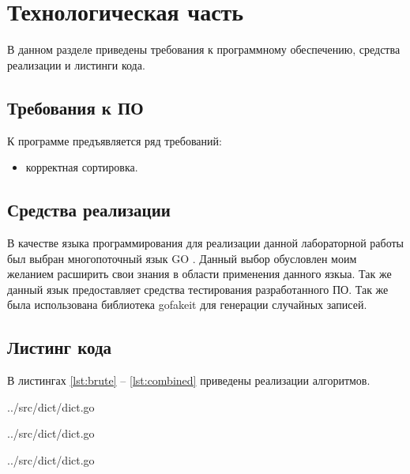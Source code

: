 \chapter{Технологическая часть}

В данном разделе приведены требования к программному обеспечению, средства реализации и листинги кода.

\section{Требования к ПО}

К программе предъявляется ряд требований:
\begin{itemize}
	\item корректная сортировка.
\end{itemize}

\section{Средства реализации}

В качестве языка программирования для реализации данной лабораторной работы был выбран многопоточный язык GO \cite{golang}. Данный выбор обусловлен моим желанием расширить свои знания в области применения данного язкыа. Так же данный язык предоставляет средства тестирования разработанного ПО. Так же была использована библиотека {\ttfamily gofakeit} \cite{faker} для генерации случайных записей.

\clearpage

\section{Листинг кода}

В листингах \ref{lst:brute} -- \ref{lst:combined} приведены реализации алгоритмов.

\begin{lstinputlisting}[
	caption={Алгоритм полного перебора},
	label={lst:brute},
	style={go},
	linerange={81-90},
	]{../src/dict/dict.go}
\end{lstinputlisting}

\begin{lstinputlisting}[
	caption={Реализация частотного анализа},
	label={lst:fa},
	style={go},
	linerange={109-146},
	]{../src/dict/dict.go}
\end{lstinputlisting}

\begin{lstinputlisting}[
	caption={Реализация алгоритма эффективного поиска},
	label={lst:combined},
	style={go},
	linerange={149-159},
	]{../src/dict/dict.go}
\end{lstinputlisting}

